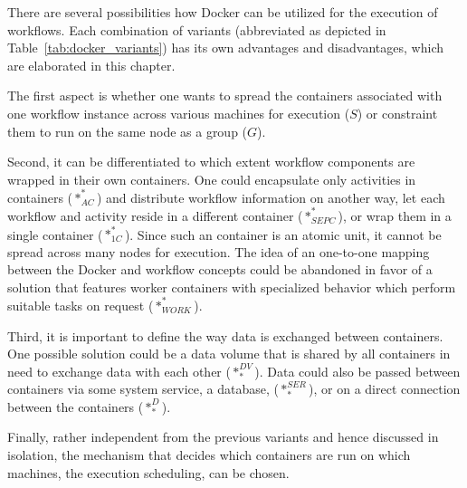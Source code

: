 
There are several possibilities how Docker can be utilized for the execution of workflows.
Each combination of variants (abbreviated as depicted in Table~\ref{tab:docker_variants}) has its own advantages and disadvantages, which are elaborated in this chapter.

The first aspect is whether one wants to spread the containers associated with one workflow instance across various machines for execution ($S$) or constraint them to run on the same node as a group ($G$).

Second, it can be differentiated to which extent workflow components are wrapped in their own containers.
One could encapsulate only activities in containers ($*_{AC}^{*}$) and distribute workflow information on another way, let each workflow and activity reside in a different container ($*_{SEPC}^{*}$), or wrap them in a single container ($*_{1C}^{*}$). Since such an container is an atomic unit, it cannot be spread across many nodes for execution. The idea of an one-to-one mapping between the Docker and workflow concepts could be abandoned in favor of a solution that features worker containers with specialized behavior which perform suitable tasks on request ($*_{WORK}^{*}$).

Third, it is important to define the way data is exchanged between containers. One possible solution could be a data volume that is shared by all containers in need to exchange data with each other ($*_{*}^{DV}$). Data could also be passed between containers via some system service, \eg a database, ($*_{*}^{SER}$), or on a direct connection between the containers ($*_{*}^{D}$).

Finally, rather independent from the previous variants and hence discussed in isolation, the mechanism that decides which containers are run on which machines, \ie the execution scheduling, can be chosen.

